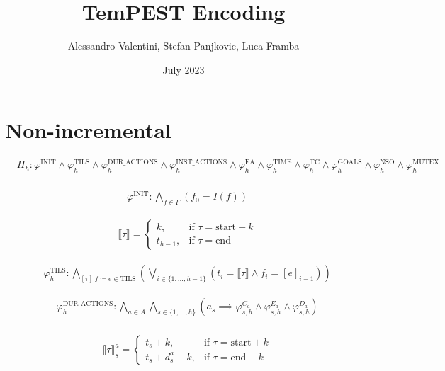 \documentclass{article}
\title{TemPEST Encoding}
\author{Alessandro Valentini, Stefan Panjkovic, Luca Framba}
\date{July 2023}
\begin{document}
\maketitle

\section{Non-incremental}

\begin{align*}
  &\Pi_h: \varphi^{\text{INIT}} \land \varphi_{h}^{\text{TILS}} \land \varphi_{h}^{\text{DUR\_ACTIONS}} \land \varphi_{h}^{\text{INST\_ACTIONS}} \land \varphi_{h}^{\text{FA}} \land \varphi_{h}^{\text{TIME}} \land \varphi_{h}^{\text{TC}} \land \varphi_{h}^{\text{GOALS}} \land \varphi_{h}^{\text{NSO}} \land \varphi_{h}^{\text{MUTEX}}\\
\end{align*}

\begin{align*}
  &\varphi^{\text{INIT}}: \bigwedge\limits_{f \in F} \left( f_{0} = I(f) \right)
\end{align*}

\begin{align*}
  &\llbracket\tau\rrbracket =
  \begin{cases}
      k, & \text{if } \tau = \text{start} + k\\
      t_{h-1}, & \text{if } \tau = \text{end}
  \end{cases}
\end{align*}

\begin{align*}
  &\varphi_h^{\text{TILS}}:\bigwedge\limits_{[\tau] \; f \coloneqq e \in \text{TILS}} \left( \bigvee\limits_{i \in \{ 1, \ldots, h-1 \}} ( t_i = \llbracket\tau\rrbracket \land f_i = [e]_{i-1}) \right)
\end{align*}

\begin{align*}
  &\varphi_h^{\text{DUR\_ACTIONS}}:\bigwedge\limits_{a \in A} \bigwedge\limits_{s \in \{ 1, \ldots, h \}} ( a_s \implies \varphi_{s, h}^{C_a} \land \varphi_{s, h}^{E_a} \land \varphi_{s, h}^{D_a} ) \\
\end{align*}

\begin{align*}
  &\llbracket\tau\rrbracket_s^a =
  \begin{cases}
      t_s + k, & \text{if } \tau = \text{start} + k\\
      t_s + d_s^a - k, & \text{if } \tau = \text{end} - k
  \end{cases}
\end{align*}
\end{document}
